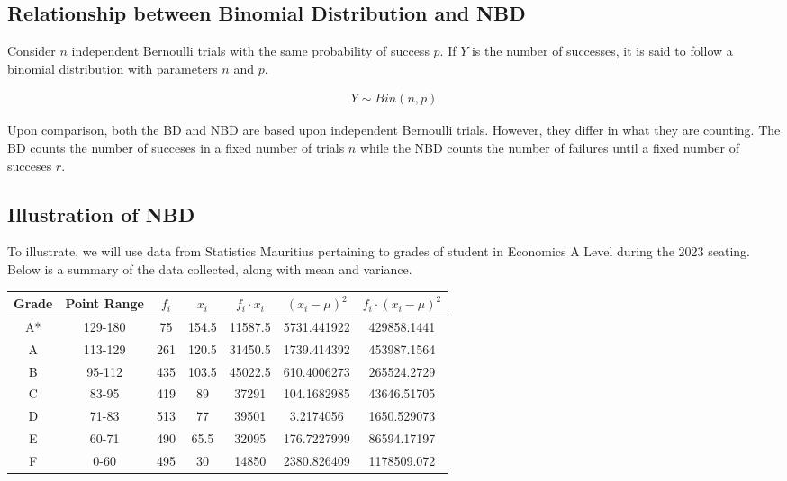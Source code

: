 \documentclass{article}
\begin{document}
\subsection{Relationship between Binomial Distribution and NBD}
Consider $ n $ independent Bernoulli trials with the same probability 
of success $ p $. If $ Y $ is the number of successes, it is said
to follow a binomial distribution with parameters $ n $ and $ p $.

\begin{gather*}
  Y \sim Bin(n, p)
\end{gather*}

Upon comparison, both the BD and NBD are based upon independent 
Bernoulli trials. However, they differ in what they are counting.
The BD counts the number of succeses in a fixed number of 
trials $ n $ while the NBD counts the number of failures until
a fixed number of succeses $ r $.

\subsection{Illustration of NBD}
To illustrate, we will use data from Statistics Mauritius pertaining
to grades of student in Economics A Level during the 2023 seating.
Below is a summary of the data collected, along with mean and 
variance.

\begin{center}
  \begin{tabular}{|c|c|c|c|c|c|c|}
    \hline
    \textbf{Grade} & \textbf{Point Range} & \textbf{$f_i$} & \textbf{$x_i$} & \textbf{$ f_i \cdot x_i $} & \textbf{$ (x_i - \mu)^2 $} & \textbf{$ f_i \cdot (x_i - \mu)^2  $}\\
    \hline
    \hline
    A* & 129-180	& 75	& 154.5	& 11587.5	& 5731.441922	& 429858.1441 \\
    A  & 113-129	& 261	& 120.5	& 31450.5	& 1739.414392	& 453987.1564 \\
    B  & 95-112	& 435	& 103.5	& 45022.5	& 610.4006273	& 265524.2729 \\
    C  & 83-95	  & 419	& 89	  & 37291	  & 104.1682985	& 43646.51705 \\
    D  & 71-83	  & 513	& 77	  & 39501	  & 3.2174056	  & 1650.529073 \\
    E  & 60-71	  & 490	& 65.5	& 32095	  & 176.7227999	& 86594.17197 \\
    F  & 0-60	  & 495	& 30	  & 14850	  & 2380.826409	& 1178509.072 \\
    \hline
  \end{tabular}
\end{center}
\end{document}
